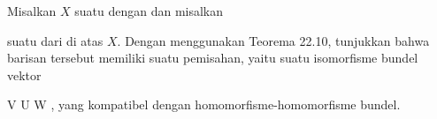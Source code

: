 \setcounter{section}{24}


{}
{

Misalkan $X$ suatu
dengan
dan misalkan

 {  }

suatu
dari
di atas $X$. Dengan menggunakan
Teorema 22.10,
tunjukkan bahwa barisan tersebut memiliki suatu pemisahan, yaitu suatu isomorfisme bundel vektor

\mavergleichskette
{\vergleichskette
{ V
}
{ \cong }{ U \oplus W
}
{  }{
}
{    }{
}
{   }{
}
}
{}{}{,}
yang kompatibel dengan homomorfisme-homomorfisme bundel.

}
{} {}

